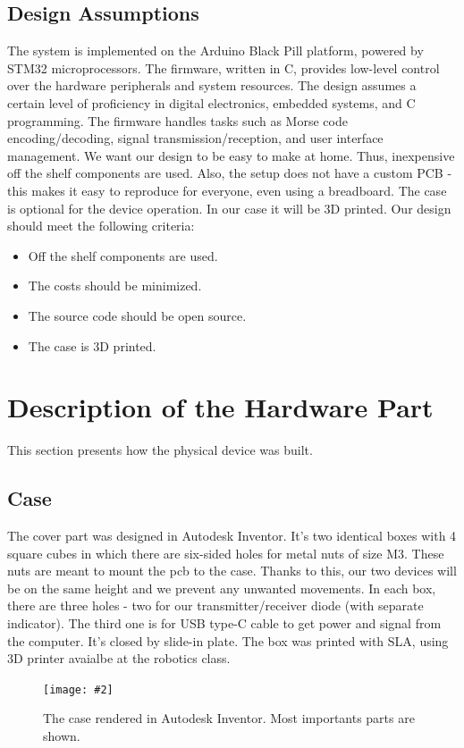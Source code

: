\documentclass[12pt]{article}
\newcommand{\image}[3]{
\begin{figure}[h]
	\begin{center}
		\texttt{[image: \#2]}
	\end{center}
  \caption{#1}
\end{figure}}
\begin{document}
	\subsection{Design Assumptions}
  The system is implemented on the Arduino Black Pill platform, powered by STM32 microprocessors. The firmware, written in C, provides low-level control over the hardware peripherals and system resources. The design assumes a certain level of 
  proficiency in digital electronics, embedded systems, and C programming. The firmware handles tasks such as Morse code encoding/decoding, signal transmission/reception, and user interface management.
  We want our design to be easy to make at home. Thus, inexpensive off the shelf components are used.
  Also, the setup does not have a custom PCB - this makes it easy to reproduce for everyone, even using a breadboard.	
  The case is optional for the device operation. In our case it will be 3D printed.
  Our design should meet the following criteria:
  \begin{itemize}
    \item Off the shelf components are used.
    \item The costs should be minimized.
    \item The source code should be open source.
    \item The case is 3D printed.
  \end{itemize}
	\section{Description of the Hardware Part}
  This section presents how the physical device was built.
  \subsection{Case}
  The cover part was designed in Autodesk Inventor. It's two identical boxes with 4 square cubes in which there are six-sided holes for metal nuts of size M3. 
  These nuts are meant to mount the pcb to the case. Thanks to this, our two devices will be on the same height and we prevent any unwanted
  movements. In each box, there are three holes - two for our transmitter/receiver diode (with separate indicator). The third one is for USB type-C cable to get 
  power and signal from the computer. It's closed by slide-in plate. The box was printed with SLA, using 3D printer avaialbe at the robotics class.
  \image{The case rendered in Autodesk Inventor. Most importants parts are shown.}{box.png}{0.4}
\end{document}
